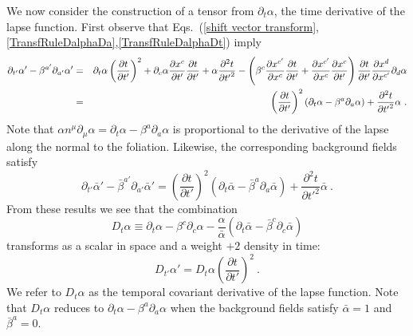 \documentclass[letterpaper,nofootinbib,prd,amsmath,onecolumn]{revtex4-1}
\begin{document}
We now consider the construction of a tensor from $\partial_{t}\alpha$, the time derivative of the lapse function. First observe that
Eqs.~(\ref{shift vector transform},\ref{TransfRuleDalphaDa},\ref{TransfRuleDalphaDt}) imply 
\begin{eqnarray}
	\partial_{t'} \alpha' - \beta^{a'}\partial_{a'}\alpha' 
	& = & \partial_{t}\alpha\left(\frac{\partial t}{\partial t'}\right)^{2} 
	+ \partial_{c}\alpha\frac{\partial x^{c}}{\partial t'}\frac{\partial t}{\partial t'} 
	+ \alpha\frac{\partial^{2}t}{\partial {t'}^{2}} - \left(\beta^{c}\frac{\partial x^{c'}}{\partial x^{c}}\frac{\partial t}{\partial t'} 
	+ \frac{\partial x^{c'}}{\partial x^{c}}\frac{\partial x^{c}}{\partial t'}\right)\frac{\partial t}{\partial t'}\frac{\partial x^{d}}
	{\partial x^{c'}}\partial_{d}\alpha\notag\\	
	& = & \left( \frac{\partial t}{\partial t'} \right)^2 ( \partial_t\alpha - \beta^a \partial_a\alpha )
	+ \frac{\partial^2 t}{\partial {t'}^2} \alpha \ .
\end{eqnarray}
Note that $\alpha n^\mu \partial_\mu\alpha = \partial_t\alpha - \beta^a \partial_a\alpha $ is proportional to 
the derivative of the lapse along the normal to the foliation. Likewise, the corresponding background fields satisfy 
\begin{equation}
	\partial_{t'} \bar\alpha' - \bar\beta^{a'}\partial_{a'}\bar\alpha' 
	= \left( \frac{\partial t}{\partial t'} \right)^2 ( \partial_t\bar\alpha - \bar\beta^a \partial_a\bar\alpha )
	+ \frac{\partial^2 t}{\partial {t'}^2} \bar\alpha \ .
\end{equation}
From these results we see that the combination 
\begin{equation}
D_{t}\alpha \equiv \partial_{t}\alpha - \beta^{c}\partial_{c}\alpha - \frac{\alpha}{{\bar \alpha}}(\partial_{t}{\bar \alpha} 
- {\bar \beta}^{c}\partial_{c}{\bar \alpha})
\end{equation}
transforms as a scalar in space and a weight $+2$ density in time: 
\begin{equation}
D_{t'}\alpha' = D_{t}\alpha\left(\frac{\partial t}{\partial t'}\right)^{2} \ .
\end{equation}
We refer to $D_t\alpha$ as the temporal covariant derivative of the lapse function. Note that $D_t\alpha$ reduces to 
$\partial_t \alpha - \beta^a\partial_a\alpha$ when the background fields satisfy $\bar\alpha = 1$ and $\bar\beta^a = 0$. 
\end{document}
